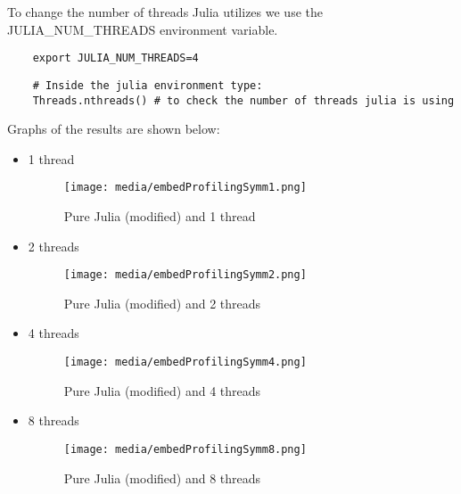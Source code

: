 To change the number of threads Julia utilizes we use the JULIA\_NUM\_THREADS environment variable.
\begin{verbatim}
    export JULIA_NUM_THREADS=4
\end{verbatim}
\begin{verbatim} 
    # Inside the julia environment type:
    Threads.nthreads() # to check the number of threads julia is using
\end{verbatim}

Graphs of the results are shown below:
\begin{itemize}
    \item 1 thread
    \begin{figure}[H]
        \texttt{[image: media/embedProfilingSymm1.png]}
        \caption{Pure Julia (modified) and 1 thread}
    \end{figure}
    \item 2 threads
    \begin{figure}[H]
        \texttt{[image: media/embedProfilingSymm2.png]}
        \caption{Pure Julia (modified) and 2 threads}
    \end{figure}
    \item 4 threads
    \begin{figure}[H]
        \texttt{[image: media/embedProfilingSymm4.png]}
        \caption{Pure Julia (modified) and 4 threads}
    \end{figure}
    \item 8 threads
    \begin{figure}[H]
        \texttt{[image: media/embedProfilingSymm8.png]}
        \caption{Pure Julia (modified) and 8 threads}
    \end{figure}
\end{itemize}